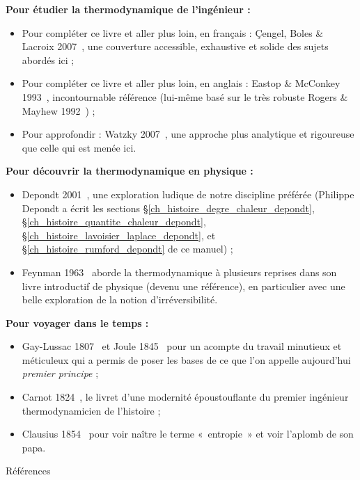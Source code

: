 \textbf{Pour étudier la thermodynamique de l’ingénieur :}

\begin{itemize}
	\item Pour compléter ce livre et aller plus loin, en français : Çengel, Boles \& Lacroix 2007~\mbox{\cite{cengeletal2008en,cengeletal2008fr}}, une couverture accessible, exhaustive et solide des sujets abordés ici ;
	\item Pour compléter ce livre et aller plus loin, en anglais : Eastop \& McConkey 1993~\cite{eastopetal1993}, incontournable référence (lui-même basé sur le très robuste Rogers \& Mayhew 1992~\cite{rogersetal1992}) ;
	\item Pour approfondir : Watzky 2007~\cite{watzky2007}, une approche plus analytique et rigoureuse que celle qui est menée ici.
\end{itemize}

\textbf{Pour découvrir la thermodynamique en physique :}

\begin{itemize}
	\item Depondt 2001~\cite{depondt2001}, une exploration ludique de notre discipline préférée (Philippe Depondt a écrit les sections \S\ref{ch_histoire_degre_chaleur_depondt}, \S\ref{ch_histoire_quantite_chaleur_depondt}, \S\ref{ch_histoire_lavoisier_laplace_depondt}, et \S\ref{ch_histoire_rumford_depondt} de ce manuel) ;
	\item Feynman 1963~\cite{feynman1963,feynman1963fr} aborde la thermodynamique à plusieurs reprises dans son livre introductif de physique (devenu une référence), en particulier avec une belle exploration de la notion d’irréversibilité.
\end{itemize}

\textbf{Pour voyager dans le temps :}

\begin{itemize}
	\item Gay-Lussac 1807~\cite{gaylussac1807} et Joule 1845~\cite{joule1845} pour un acompte du travail minutieux et méticuleux qui a permis de poser les bases de ce que l’on appelle aujourd’hui \textit{premier principe} ;
	\item Carnot 1824~\cite{carnot1824}, le livret d’une modernité époustouflante du premier ingénieur thermodynamicien de l’histoire ;
	\item Clausius 1854~\cite{clausius1854} pour voir naître le terme «~entropie~» et voir l’aplomb de son papa.
\end{itemize}

{\center \normalsize \Large Références\par}

\printbibliography[heading=none]
